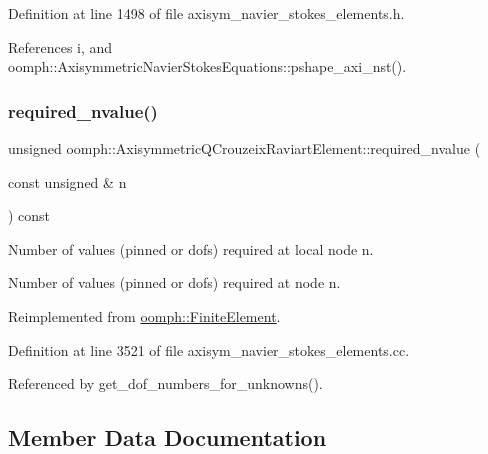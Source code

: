 Definition at line 1498 of file axisym\+\_\+navier\+\_\+stokes\+\_\+elements.\+h.



References i, and oomph\+::\+Axisymmetric\+Navier\+Stokes\+Equations\+::pshape\+\_\+axi\+\_\+nst().

\mbox{\label{classoomph_1_1AxisymmetricQCrouzeixRaviartElement_ae7988679549e63ef87fc3f062fb6a559}} 
\subsubsection{\texorpdfstring{required\+\_\+nvalue()}{required\_nvalue()}}
{\footnotesize\ttfamily unsigned oomph\+::\+Axisymmetric\+Q\+Crouzeix\+Raviart\+Element\+::required\+\_\+nvalue (\begin{DoxyParamCaption}\item[{const unsigned \&}]{n }\end{DoxyParamCaption}) const\hspace{0.3cm}{\ttfamily [virtual]}}



Number of values (pinned or dofs) required at local node n. 

Number of values (pinned or dofs) required at node n. 

Reimplemented from \hyperlink{classoomph_1_1FiniteElement_a56610c60d5bc2d7c27407a1455471b1a}{oomph\+::\+Finite\+Element}.



Definition at line 3521 of file axisym\+\_\+navier\+\_\+stokes\+\_\+elements.\+cc.



Referenced by get\+\_\+dof\+\_\+numbers\+\_\+for\+\_\+unknowns().



\subsection{Member Data Documentation}
\mbox{\label{classoomph_1_1AxisymmetricQCrouzeixRaviartElement_a6edd4a05741c3ee8ee1ac82f7c3f9eff}} 
